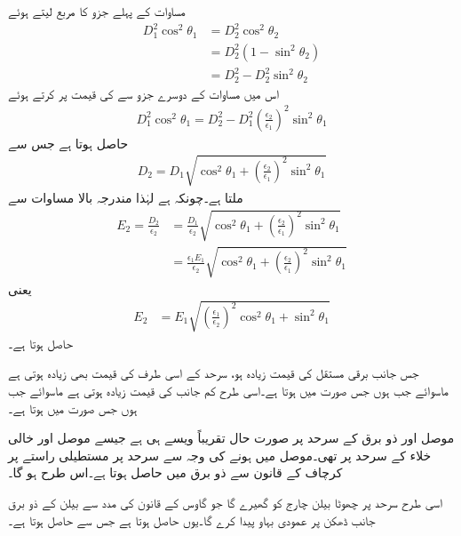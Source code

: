 مساوات  کے پہلے جزو کا مربع لیتے ہوئے
\begin{align*}
D_1^2 \cos^2 \theta_1&=D_2^2 \cos^2 \theta_2\\
&=D_2^2 (1-\sin^2 \theta_2)\\
&=D_2^2-D_2^2 \sin^2\theta_2
\end{align*}
اس میں مساوات  کے دوسرے جزو سے  کی قیمت پر کرتے ہوئے
\begin{align*}
D_1^2 \cos^2\theta_1=D_2^2-D_1^2 \left(\frac{\epsilon_2}{\epsilon_1}\right)^2\sin^2\theta_1
\end{align*}
حاصل ہوتا ہے جس سے
\begin{align}
D_2=D_1\sqrt{\cos^2\theta_1+\left(\frac{\epsilon_2}{\epsilon_1}\right)^2\sin^2\theta_1}
\end{align}
ملتا ہے۔چونکہ  ہے لہٰذا مندرجہ بالا مساوات سے
\begin{align*}
E_2=\frac{D_2}{\epsilon_2}&=\frac{D_1}{\epsilon_2}\sqrt{\cos^2\theta_1+\left(\frac{\epsilon_2}{\epsilon_1}\right)^2\sin^2\theta_1}\\
&=\frac{\epsilon_1 E_1}{\epsilon_2}\sqrt{\cos^2\theta_1+\left(\frac{\epsilon_2}{\epsilon_1}\right)^2\sin^2\theta_1}
\end{align*}
یعنی
\begin{align}
E_2&=E_1\sqrt{\left(\frac{\epsilon_1}{\epsilon_2} \right)^2\cos^2\theta_1+\sin^2\theta_1}
\end{align}
حاصل ہوتا ہے۔

جس جانب برقی مستقل کی قیمت  زیادہ ہو، سرحد کے اسی طرف  کی قیمت بھی زیادہ ہوتی ہے ماسوائے جب  ہوں جس صورت میں   ہوتا ہے۔اسی طرح کم  جانب  کی قیمت زیادہ ہوتی ہے ماسوائے جب  ہوں جس صورت میں  ہوتا ہے۔

موصل اور ذو برق کے سرحد پر صورت حال تقریباً ویسے ہی ہے جیسے موصل اور خالی خلاء کے سرحد پر تھی۔موصل میں  ہونے کی وجہ سے سرحد پر مستطیلی راستے پر کرچاف کے قانون سے ذو برق میں  حاصل ہوتا ہے۔اس طرح  ہو گا۔

اسی طرح سرحد پر چھوٹا بیلن  چارج کو گھیرے گا جو گاوس کے قانون کی مدد سے بیلن کے ذو برق جانب ڈھکن پر  عمودی بہاو  پیدا کرے گا۔یوں  حاصل ہوتا ہے جس سے  حاصل ہوتا ہے۔

